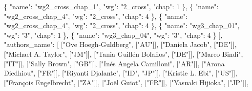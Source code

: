 \documentclass[
]{article}
\newenvironment{Shaded}{}{}
\newcommand{\DataTypeTok}[1]{\textcolor[rgb]{0.56,0.13,0.00}{#1}}
\newcommand{\DecValTok}[1]{\textcolor[rgb]{0.25,0.63,0.44}{#1}}
\newcommand{\FunctionTok}[1]{\textcolor[rgb]{0.02,0.16,0.49}{#1}}
\newcommand{\OtherTok}[1]{\textcolor[rgb]{0.00,0.44,0.13}{#1}}
\newcommand{\StringTok}[1]{\textcolor[rgb]{0.25,0.44,0.63}{#1}}
\begin{document}
\begin{Shaded}
\begin{Highlighting}[]
    \FunctionTok{\{} \DataTypeTok{"name"}\FunctionTok{:} \StringTok{"wg2\_cross\_chap\_1"}\FunctionTok{,} \DataTypeTok{"wg"}\FunctionTok{:} \StringTok{"2\_cross"}\FunctionTok{,} \DataTypeTok{"chap"}\FunctionTok{:} \DecValTok{1} \FunctionTok{\}}\OtherTok{,}
    \FunctionTok{\{} \DataTypeTok{"name"}\FunctionTok{:} \StringTok{"wg2\_cross\_chap\_4"}\FunctionTok{,} \DataTypeTok{"wg"}\FunctionTok{:} \StringTok{"2\_cross"}\FunctionTok{,} \DataTypeTok{"chap"}\FunctionTok{:} \DecValTok{4} \FunctionTok{\}}\OtherTok{,}
    \FunctionTok{\{} \DataTypeTok{"name"}\FunctionTok{:} \StringTok{"wg2\_cross\_chap\_4"}\FunctionTok{,} \DataTypeTok{"wg"}\FunctionTok{:} \StringTok{"2\_cross"}\FunctionTok{,} \DataTypeTok{"chap"}\FunctionTok{:} \DecValTok{4} \FunctionTok{\}}\OtherTok{,}
    \FunctionTok{\{} \DataTypeTok{"name"}\FunctionTok{:} \StringTok{"wg3\_chap\_01"}\FunctionTok{,} \DataTypeTok{"wg"}\FunctionTok{:} \StringTok{"3"}\FunctionTok{,} \DataTypeTok{"chap"}\FunctionTok{:} \DecValTok{1} \FunctionTok{\}}\OtherTok{,}
    \FunctionTok{\{} \DataTypeTok{"name"}\FunctionTok{:} \StringTok{"wg3\_chap\_04"}\FunctionTok{,} \DataTypeTok{"wg"}\FunctionTok{:} \StringTok{"3"}\FunctionTok{,} \DataTypeTok{"chap"}\FunctionTok{:} \DecValTok{4} \FunctionTok{\}}
  \OtherTok{]}\FunctionTok{,}
  \DataTypeTok{"authors\_name"}\FunctionTok{:} \OtherTok{[}
    \OtherTok{[}\StringTok{"Ove Hoegh‐Guldberg"}\OtherTok{,} \OtherTok{[}\StringTok{"AU"}\OtherTok{]],}
    \OtherTok{[}\StringTok{"Daniela Jacob"}\OtherTok{,} \OtherTok{[}\StringTok{"DE"}\OtherTok{]],}
    \OtherTok{[}\StringTok{"Michael A. Taylor"}\OtherTok{,} \OtherTok{[}\StringTok{"JM"}\OtherTok{]],}
    \OtherTok{[}\StringTok{"Tania Guillén Bolaños"}\OtherTok{,} \OtherTok{[}\StringTok{"DE"}\OtherTok{]],}
    \OtherTok{[}\StringTok{"Marco Bindi"}\OtherTok{,} \OtherTok{[}\StringTok{"IT"}\OtherTok{]],}
    \OtherTok{[}\StringTok{"Sally Brown"}\OtherTok{,} \OtherTok{[}\StringTok{"GB"}\OtherTok{]],}
    \OtherTok{[}\StringTok{"Inés Angela Camilloni"}\OtherTok{,} \OtherTok{[}\StringTok{"AR"}\OtherTok{]],}
    \OtherTok{[}\StringTok{"Arona Diedhiou"}\OtherTok{,} \OtherTok{[}\StringTok{"FR"}\OtherTok{]],}
    \OtherTok{[}\StringTok{"Riyanti Djalante"}\OtherTok{,} \OtherTok{[}\StringTok{"ID"}\OtherTok{,} \StringTok{"JP"}\OtherTok{]],}
    \OtherTok{[}\StringTok{"Kristie L. Ebi"}\OtherTok{,} \OtherTok{[}\StringTok{"US"}\OtherTok{]],}
    \OtherTok{[}\StringTok{"François Engelbrecht"}\OtherTok{,} \OtherTok{[}\StringTok{"ZA"}\OtherTok{]],}
    \OtherTok{[}\StringTok{"Joël Guiot"}\OtherTok{,} \OtherTok{[}\StringTok{"FR"}\OtherTok{]],}
    \OtherTok{[}\StringTok{"Yasuaki Hijioka"}\OtherTok{,} \OtherTok{[}\StringTok{"JP"}\OtherTok{]],}

\end{Highlighting}
\end{Shaded}
\end{document}
